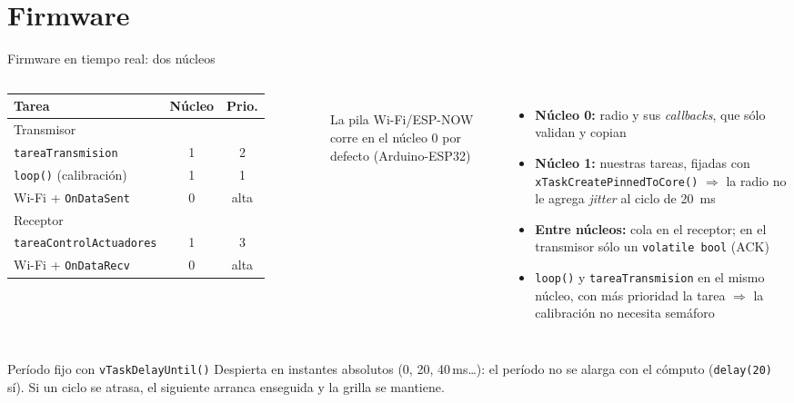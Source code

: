 \documentclass[aspectratio=169,10pt]{beamer}
\begin{document}
\section{Firmware}

\begin{frame}{Firmware en tiempo real: dos núcleos}
  \begin{columns}[T]
    \centering\small
    \begin{tabular}{l c c}
      \toprule
      \textbf{Tarea} & \textbf{Núcleo} & \textbf{Prio.} \\
      \midrule
      \multicolumn{3}{l}{\color{tenue}\scriptsize Transmisor} \\
      \texttt{tareaTransmision} & 1 & 2 \\
      \texttt{loop()} (calibración) & 1 & 1 \\
      Wi-Fi + \texttt{OnDataSent} & 0 & alta \\
      \midrule
      \multicolumn{3}{l}{\color{tenue}\scriptsize Receptor} \\
      \texttt{tareaControlActuadores} & 1 & 3 \\
      Wi-Fi + \texttt{OnDataRecv} & 0 & alta \\
      \bottomrule
    \end{tabular}\\[1ex]
    {\scriptsize La pila Wi-Fi/ESP-NOW corre en el núcleo 0 por defecto (Arduino-ESP32)}
    \begin{itemize}\small
      \item \textbf{Núcleo 0:} radio y sus \textit{callbacks}, que sólo validan y copian
      \item \textbf{Núcleo 1:} nuestras tareas, fijadas con \texttt{xTaskCreatePinnedToCore()} $\Rightarrow$ la radio no le agrega \textit{jitter} al ciclo de \SI{20}{\milli\second}
      \item \textbf{Entre núcleos:} cola en el receptor; en el transmisor sólo un \texttt{volatile bool} (ACK)
      \item \texttt{loop()} y \texttt{tareaTransmision} en el mismo núcleo, con más prioridad la tarea $\Rightarrow$ la calibración no necesita semáforo
    \end{itemize}
  \end{columns}
  \vspace{1.5ex}
  \begin{block}{Período fijo con \texttt{vTaskDelayUntil()}}
    \small Despierta en instantes absolutos (0, 20, 40\,ms\ldots): el período no se alarga con el cómputo (\texttt{delay(20)} sí).
    Si un ciclo se atrasa, el siguiente arranca enseguida y la grilla se mantiene.
  \end{block}
\end{frame}
\end{document}
